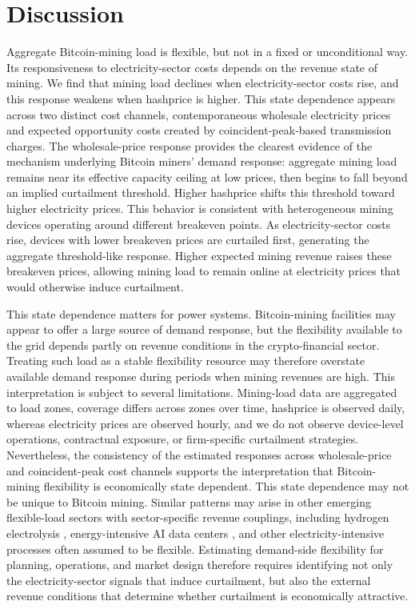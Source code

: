 \documentclass[pdflatex,sn-mathphys-num]{sn-jnl}%
\theoremstyle{thmstyleone}%
\theoremstyle{thmstyletwo}%
\theoremstyle{thmstylethree}%
\begin{document}
\section{Discussion}\label{sec4}

Aggregate Bitcoin-mining load is flexible, but not in a fixed or unconditional way. Its responsiveness to electricity-sector costs depends on the revenue state of mining. We find that mining load declines when electricity-sector costs rise, and this response weakens when hashprice is higher. This state dependence appears across two distinct cost channels, contemporaneous wholesale electricity prices and expected opportunity costs created by coincident-peak-based transmission charges. The wholesale-price response provides the clearest evidence of the mechanism underlying Bitcoin miners' demand response: aggregate mining load remains near its effective capacity ceiling at low prices, then begins to fall beyond an implied curtailment threshold. Higher hashprice shifts this threshold toward higher electricity prices. This behavior is consistent with heterogeneous mining devices operating around different breakeven points. As electricity-sector costs rise, devices with lower breakeven prices are curtailed first, generating the aggregate threshold-like response. Higher expected mining revenue raises these breakeven prices, allowing mining load to remain online at electricity prices that would otherwise induce curtailment.

This state dependence matters for power systems. Bitcoin-mining facilities may appear to offer a large source of demand response, but the flexibility available to the grid depends partly on revenue conditions in the crypto-financial sector. Treating such load as a stable flexibility resource may therefore overstate available demand response during periods when mining revenues are high. This interpretation is subject to several limitations. Mining-load data are aggregated to load zones, coverage differs across zones over time, hashprice is observed daily, whereas electricity prices are observed hourly, and we do not observe device-level operations, contractual exposure, or firm-specific curtailment strategies. Nevertheless, the consistency of the estimated responses across wholesale-price and coincident-peak cost channels supports the interpretation that Bitcoin-mining flexibility is economically state dependent. This state dependence may not be unique to Bitcoin mining. Similar patterns may arise in other emerging flexible-load sectors with sector-specific revenue couplings, including hydrogen electrolysis \cite{ruhnau2022flexible}, energy-intensive AI data centers \cite{colangelo2026ai}, and other electricity-intensive processes often assumed to be flexible. Estimating demand-side flexibility for planning, operations, and market design therefore requires identifying not only the electricity-sector signals that induce curtailment, but also the external revenue conditions that determine whether curtailment is economically attractive.
\end{document}
